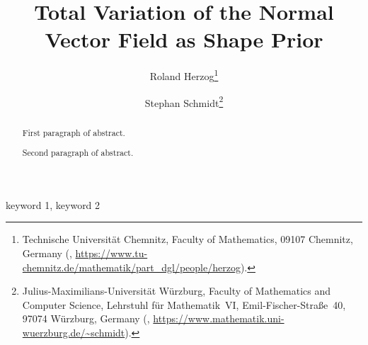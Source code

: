 \documentclass{numapde-preprint}
\title{Total Variation of the Normal Vector Field as Shape Prior}
\subtitle{}
\author{Roland Herzog\thanks{Technische Universität Chemnitz, Faculty of Mathematics, 09107 Chemnitz, Germany (\email{roland.herzog@mathematik.tu-chemnitz.de}, \url{https://www.tu-chemnitz.de/mathematik/part_dgl/people/herzog}).}
\and
Stephan Schmidt\thanks{Julius-Maximilians-Universität Würzburg, Faculty of Mathematics and Computer Science, Lehrstuhl für Mathematik~VI, Emil-Fischer-Straße~40, 97074 Würzburg, Germany (\email{stephan.schmidt@mathematik.uni-wuerzburg.de}, \url{https://www.mathematik.uni-wuerzburg.de/\~schmidt}).}}
\begin{document}
\maketitle

\begin{abstract}
First paragraph of abstract.

Second paragraph of abstract.\end{abstract}

\begin{keywords}
keyword 1, keyword 2\end{keywords}





\printbibliography
\end{document}
